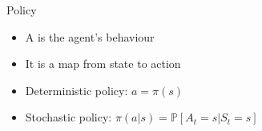 \bgroup
\begin{frame}{Policy}
\begin{itemize}
\item A  is the agent's behaviour
\item It is a map from state to action
\item Deterministic policy: $a = \pi(s)$
\item Stochastic policy: $\pi(a|s) = \mathbb{P}[A_t=s | S_t=s]$
\end{itemize}
\end{frame}
\egroup